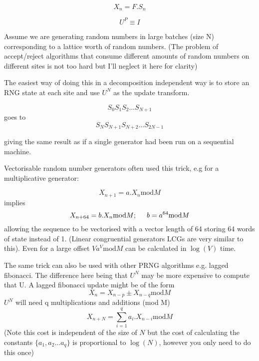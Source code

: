 \documentclass[12pt]{article}
\begin{document}
\begin{equation}
 X_{n} = F.S_{n}
\end{equation}

\begin{equation}
  U^{P} \equiv I
\end{equation}


Assume we are generating random numbers in large batches (size N)
corresponding to a lattice worth of random numbers. (The
problem of accept/reject algorithms that consume different amounts of
random numbers on different sites is not too hard but I'll neglect it
here for clarity)

The easiest way of doing this in a decomposition independent way is to
store an RNG state at each site and use $U^N$ as the update transform.

\begin{equation}
 S_0   S_1   S_2  . . .     S_{N+1}
\end{equation}
goes to
\begin{equation}
 S_N   S_{N+1}   S_{N+2}  . . .     S_{2N-1}
\end{equation}

giving the same result as if a single generator had been run on a
sequential machine.

Vectorisable random number generators often used this trick, e.g for a
multiplicative  generator:

\begin{equation}
  X_{n+1}     = a . X_n  \mbox{mod} M
\end{equation}
implies
\begin{equation}
  X_{n+64}     = b . X_n \mbox{mod} M;  \hspace{5mm}  b = a^{64} \mbox{mod} M
\end{equation}
allowing the sequence to be vectorised with a vector length of 64
storing 64 words of state instead of 1.
(Linear congruential generators LCGs are very similar to this).
Even for a large offset $V a^V \mbox{mod} M$ can be calculated in $\log(V)$ time.


The same trick can also be used with other PRNG algorithms e.g. lagged
fibonacci. The difference here being that $U^N$ may be more expensive to
compute that U.  A lagged fibonacci update might be of the form
\begin{equation}
    X_n   =  X_{n-p} \pm  X_{n-q} \mbox{mod} M
\end{equation}
$U^N$ will need q multiplications and additions (mod M)
\begin{equation}
X_{n+N}= \sum_{i=1}^{q}    a_i .X_{n-i}  \mbox{mod} M
\end{equation}
(Note this cost is independent of the size of $N$ but the cost of
 calculating the constants $\{a_1, a_2 ... a_q\}$ is proportional to
 $\log(N)$, however you only need to do this once)
\end{document}

